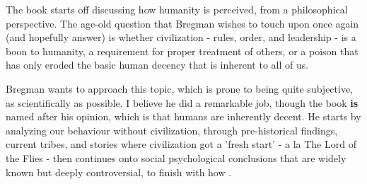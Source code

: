 The book starts off discussing how humanity is perceived, from a philosophical perspective. The age-old question that Bregman wishes to touch upon once again (and hopefully answer) is whether civilization - rules, order, and leadership - is a boon to humanity, a requirement for proper treatment of others, or a poison that has only eroded the basic human decency that is inherent to all of us.

Bregman wants to approach this topic, which is prone to being quite subjective, as scientifically as possible. I believe he did a remarkable job, though the book \textbf{is} named after his opinion, which is that humans are inherently decent. He starts by analyzing our behaviour without civilization, through pre-historical findings, current tribes, and stories where civilization got a 'fresh start' - a la The Lord of the Flies - then continues onto social psychological conclusions that are widely known but deeply controversial, to finish with how .